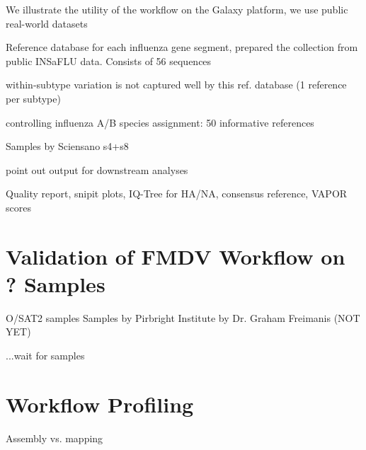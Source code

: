 We illustrate the utility of the workflow on the Galaxy platform, we use public real-world datasets

Reference database for each influenza gene segment, prepared the collection from public INSaFLU data. Consists of 56 sequences

within-subtype variation is not captured well by this ref. database (1 reference per subtype)

controlling influenza A/B species assignment: 50 informative references

Samples by Sciensano s4+s8

point out output for downstream analyses 

Quality report, snipit plots, IQ-Tree for \ac{HA}/\ac{NA}, consensus reference, VAPOR scores

\section{Validation of FMDV Workflow on ? Samples}
O/SAT2 samples
\todoit
Samples by Pirbright Institute by Dr. Graham Freimanis (NOT YET)

...wait for samples

\section{Workflow Profiling}
\todoit
Assembly vs. mapping
 